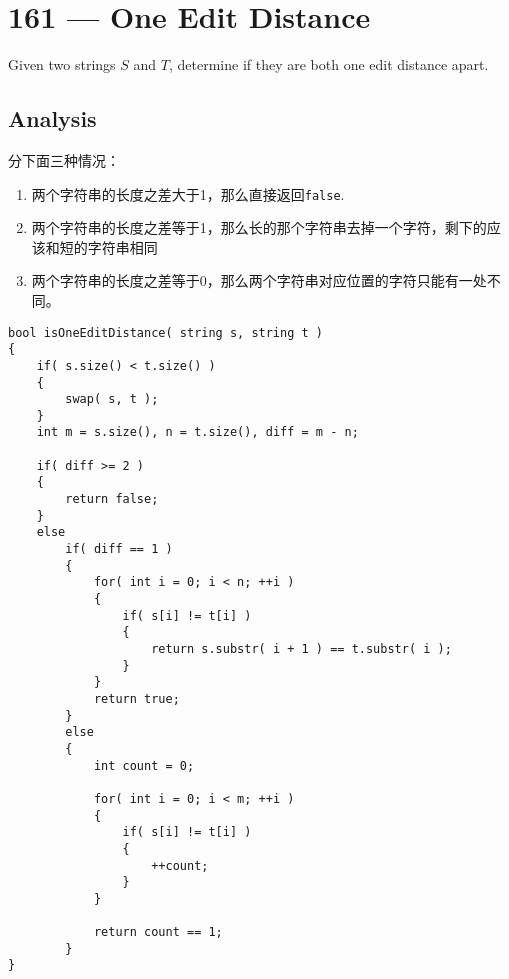 \section{161 --- One Edit Distance}
Given two strings $S$ and $T$, determine if they are both one edit distance apart.
\subsection{Analysis}

分下面三种情况：
\begin{enumerate}
\item 两个字符串的长度之差大于1，那么直接返回\texttt{false}.
\item 两个字符串的长度之差等于1，那么长的那个字符串去掉一个字符，剩下的应该和短的字符串相同
\item 两个字符串的长度之差等于0，那么两个字符串对应位置的字符只能有一处不同。
\end{enumerate}

\setcounter{lstlisting}{0}
\begin{lstlisting}[style=customc, caption={Reference Code}]
bool isOneEditDistance( string s, string t )
{
    if( s.size() < t.size() )
    {
        swap( s, t );
    }
    int m = s.size(), n = t.size(), diff = m - n;

    if( diff >= 2 )
    {
        return false;
    }
    else
        if( diff == 1 )
        {
            for( int i = 0; i < n; ++i )
            {
                if( s[i] != t[i] )
                {
                    return s.substr( i + 1 ) == t.substr( i );
                }
            }
            return true;
        }
        else
        {
            int count = 0;
            
            for( int i = 0; i < m; ++i )
            {
                if( s[i] != t[i] )
                {
                    ++count;
                }
            }

            return count == 1;
        }
}
\end{lstlisting}